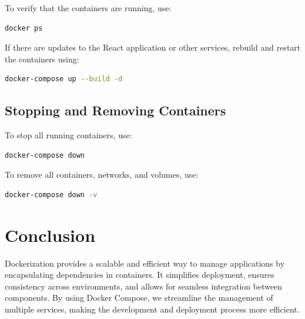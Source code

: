 \documentclass[a4paper,12pt]{report}
\begin{document}
To verify that the containers are running, use:

\begin{lstlisting}[language=bash]
docker ps
\end{lstlisting}

If there are updates to the React application or other services, rebuild and restart the containers using:

\begin{lstlisting}[language=bash]
docker-compose up --build -d
\end{lstlisting}

\subsection{Stopping and Removing Containers}

To stop all running containers, use:

\begin{lstlisting}[language=bash]
docker-compose down
\end{lstlisting}

To remove all containers, networks, and volumes, use:

\begin{lstlisting}[language=bash]
docker-compose down -v
\end{lstlisting}

\section{Conclusion}

Dockerization provides a scalable and efficient way to manage applications by encapsulating dependencies in containers. It simplifies deployment, ensures consistency across environments, and allows for seamless integration between components. By using Docker Compose, we streamline the management of multiple services, making the development and deployment process more efficient.
\end{document}
